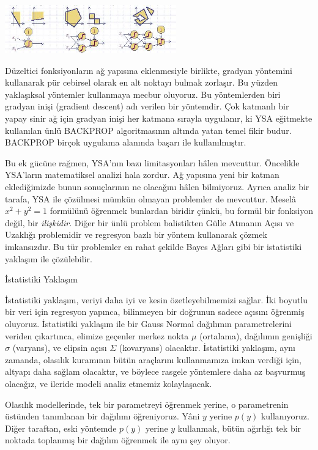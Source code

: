 \documentclass[12pt,fleqn]{article}\usepackage{../../common}
\begin{document}
\includegraphics[width=20em]{nn1.jpg}

Düzeltici fonksiyonların ağ yapısına eklenmesiyle birlikte, gradyan
yöntemini kullanarak pür cebirsel olarak en alt noktayı bulmak zorlaşır. Bu
yüzden yaklaşıksal yöntemler kullanmaya mecbur oluyoruz. Bu yöntemlerden
biri gradyan inişi (gradient descent) adı verilen bir yöntemdir. Çok
katmanlı bir yapay sinir ağ için gradyan inişi her katmana sırayla
uygulanır, ki YSA eğitmekte kullanılan ünlü BACKPROP algoritmasının altında
yatan temel fikir budur. BACKPROP birçok uygulama alanında başarı ile
kullanılmıştır.

Bu ek gücüne rağmen, YSA'nın bazı limitasyonları hâlen mevcuttur. Öncelikle
YSA'ların matematiksel analizi hala zordur. Ağ yapısına yeni bir katman
eklediğimizde bunun sonuçlarının ne olacağını hâlen bilmiyoruz. Ayrıca
analiz bir tarafa, YSA ile çözülmesi mümkün olmayan problemler de
mevcuttur. Meselâ $x^2+y^2=1$ formülünü öğrenmek bunlardan biridir çünkü,
bu formül bir fonksiyon değil, bir {\em ilişkidir}. Diğer bir ünlü problem
balistikten Gülle Atmanın Açısı ve Uzaklığı problemidir ve regresyon bazlı
bir yöntem kullanarak çözmek imkansızdır. Bu tür problemler en rahat
şekilde Bayes Ağları gibi bir istatistiki yaklaşım ile çözülebilir.

İstatistiki Yaklaşım

İstatistiki yaklaşım, veriyi daha iyi ve kesin özetleyebilmemizi
sağlar. İki boyutlu bir veri için regresyon yapınca, bilinmeyen bir
doğrunun sadece açısını öğrenmiş oluyoruz. İstatistiki yaklaşım ile bir
Gauss Normal dağılımın parametrelerini veriden çıkartınca, elimize geçenler
merkez nokta $\mu$ (ortalama), dağılımın genişliği $\sigma$ (varyans), ve
elipsin açısı $\Sigma$ (kovaryans) olacaktır. İstatistiki yaklaşım, aynı
zamanda, olasılık kuramının bütün araçlarını kullanmamıza imkan verdiği
için, altyapı daha sağlam olacaktır, ve böylece rasgele yöntemlere daha az
başvurmuş olacağız, ve ileride modeli analiz etmemiz kolaylaşacak.

Olasılık modellerinde, tek bir parametreyi öğrenmek yerine, o parametrenin
üstünden tanımlanan bir dağılımı öğreniyoruz. Yâni $y$ yerine $p(y)$
kullanıyoruz. Diğer taraftan, eski yöntemde $p(y)$ yerine $y$ kullanmak,
bütün ağırlığı tek bir noktada toplanmış bir dağılım öğrenmek ile aynı şey
oluyor.
\end{document}
